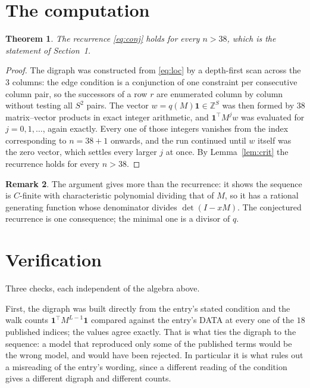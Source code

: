 \documentclass[11pt,a4paper]{article}
\theoremstyle{plain}
\newtheorem{theorem}{Theorem}
\theoremstyle{definition}
\newtheorem{remark}[theorem]{Remark}
\begin{document}
\section{The computation}

\begin{theorem}
The recurrence \eqref{eq:conj} holds for every $n>38$, which is the statement of
Section~1.
\end{theorem}

\begin{proof}
The digraph was constructed from \eqref{eq:loc} by a depth-first scan across the $3$
columns: the edge condition is a conjunction of one constraint per consecutive column
pair, so the successors of a row $r$ are enumerated column by column without testing all
$S^2$ pairs. The vector $w=q(M)\mathbf{1}\in\mathbb{Z}^{S}$ was then formed by $38$
matrix--vector products in exact integer arithmetic, and $\mathbf{1}^{\!\top}M^{j}w$ was
evaluated for $j=0,1,\dots$, again exactly. Every one of those integers vanishes from the
index corresponding to $n=38+1$ onwards, and the run continued until $w$ itself was the
zero vector, which settles every larger $j$ at once. By Lemma~\ref{lem:crit} the recurrence
holds for every $n>38$.
\end{proof}

\begin{remark}
The argument gives more than the recurrence: it shows the sequence is $C$-finite with
characteristic polynomial dividing that of $M$, so it has a rational generating function
whose denominator divides $\det(I-xM)$. The conjectured recurrence is one consequence; the
minimal one is a divisor of $q$.
\end{remark}

\section{Verification}

Three checks, each independent of the algebra above.

First, the digraph was built directly from the entry's stated condition and the walk counts
$\mathbf{1}^{\!\top}M^{L-1}\mathbf{1}$ compared against the entry's DATA at
every one of the $18$ published indices; the values agree exactly. That is what ties
the digraph to the sequence: a model that reproduced only some of the published terms would
be the wrong model, and would have been rejected. In particular it is what rules out a
misreading of the entry's wording, since a different reading of the condition gives a
different digraph and different counts.
\end{document}
